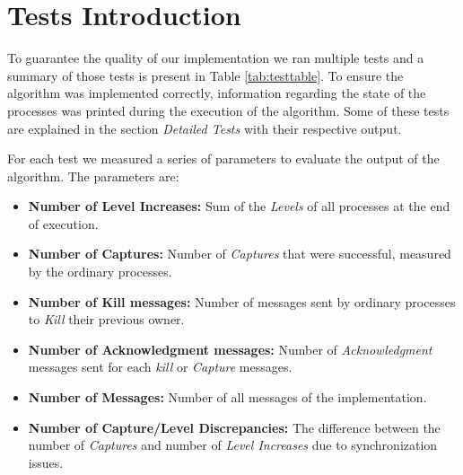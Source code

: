 \section*{Tests Introduction}

	\vspace{10pt}

	\indent To guarantee the quality of our implementation we ran multiple tests and a summary of those tests is present in Table \ref{tab:testtable}. To ensure the algorithm was implemented correctly, information regarding the state of the processes was printed during the execution of the algorithm. Some of these tests are explained in the section \textit{Detailed Tests} with their respective output.

	For each test we measured a series of parameters to evaluate the output of the algorithm. The parameters are:

	\begin{itemize}
		\item{\textbf{Number of Level Increases:}} Sum of the \textit{Levels} of all processes at the end of execution. 
		\item{\textbf{Number of Captures:}} Number of \textit{Captures} that were successful, measured by the ordinary processes.
		\item{\textbf{Number of Kill messages:}} Number of messages sent by ordinary processes to \textit{Kill} their previous owner.
		\item{\textbf{Number of Acknowledgment messages:}} Number of \textit{Acknowledgment} messages sent for each \textit{kill} or \textit{Capture} messages.
		\item{\textbf{Number of Messages:}} Number of all messages of the implementation.
		\item{\textbf{Number of Capture/Level Discrepancies:}} The difference between the number of \textit{Captures} and number of \textit{Level Increases} due to synchronization issues.

	\end{itemize}

